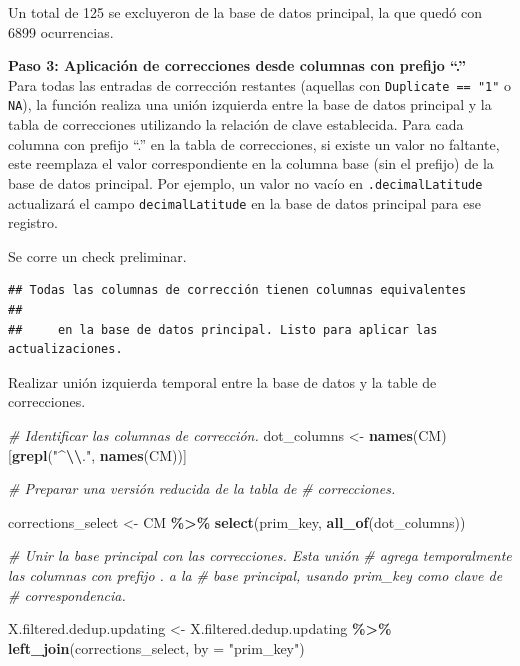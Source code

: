 \documentclass[sn-apa,pdflatex]{sn-jnl}
\newenvironment{Shaded}{\begin{snugshade}}{\end{snugshade}}
\newcommand{\AttributeTok}[1]{\textcolor[rgb]{0.13,0.29,0.53}{#1}}
\newcommand{\CommentTok}[1]{\textcolor[rgb]{0.56,0.35,0.01}{\textit{#1}}}
\newcommand{\FunctionTok}[1]{\textcolor[rgb]{0.13,0.29,0.53}{\textbf{#1}}}
\newcommand{\NormalTok}[1]{#1}
\newcommand{\OtherTok}[1]{\textcolor[rgb]{0.56,0.35,0.01}{#1}}
\newcommand{\SpecialCharTok}[1]{\textcolor[rgb]{0.81,0.36,0.00}{\textbf{#1}}}
\newcommand{\StringTok}[1]{\textcolor[rgb]{0.31,0.60,0.02}{#1}}
\begin{document}
Un total de 125 se excluyeron de la base de datos principal, la que
quedó con 6899 ocurrencias.

\textbf{Paso 3: Aplicación de correcciones desde columnas con prefijo
``.''}\\
Para todas las entradas de corrección restantes (aquellas con
\texttt{Duplicate\ ==\ "1"} o \texttt{NA}), la función realiza una unión
izquierda entre la base de datos principal y la tabla de correcciones
utilizando la relación de clave establecida. Para cada columna con
prefijo ``.'' en la tabla de correcciones, si existe un valor no
faltante, este reemplaza el valor correspondiente en la columna base
(sin el prefijo) de la base de datos principal. Por ejemplo, un valor no
vacío en \texttt{.decimalLatitude} actualizará el campo
\texttt{decimalLatitude} en la base de datos principal para ese
registro.

Se corre un check preliminar.

\begin{verbatim}
## Todas las columnas de corrección tienen columnas equivalentes 
##  
##     en la base de datos principal. Listo para aplicar las actualizaciones.
\end{verbatim}

Realizar unión izquierda temporal entre la base de datos y la table de
correcciones.

\begin{Shaded}
\begin{Highlighting}[]
\CommentTok{\# Identificar las columnas de corrección.}
\NormalTok{dot\_columns }\OtherTok{\textless{}{-}} \FunctionTok{names}\NormalTok{(CM)[}\FunctionTok{grepl}\NormalTok{(}\StringTok{"\^{}}\SpecialCharTok{\textbackslash{}\textbackslash{}}\StringTok{."}\NormalTok{, }\FunctionTok{names}\NormalTok{(CM))]}

\CommentTok{\# Preparar una versión reducida de la tabla de}
\CommentTok{\# correcciones.}

\NormalTok{corrections\_select }\OtherTok{\textless{}{-}}\NormalTok{ CM }\SpecialCharTok{\%\textgreater{}\%}
    \FunctionTok{select}\NormalTok{(prim\_key, }\FunctionTok{all\_of}\NormalTok{(dot\_columns))}


\CommentTok{\# Unir la base principal con las correcciones.  Esta unión}
\CommentTok{\# agrega temporalmente las columnas con prefijo \textquotesingle{}.\textquotesingle{} a la}
\CommentTok{\# base principal, usando \textasciigrave{}prim\_key\textasciigrave{} como clave de}
\CommentTok{\# correspondencia.}

\NormalTok{X.filtered.dedup.updating }\OtherTok{\textless{}{-}}\NormalTok{ X.filtered.dedup.updating }\SpecialCharTok{\%\textgreater{}\%}
    \FunctionTok{left\_join}\NormalTok{(corrections\_select, }\AttributeTok{by =} \StringTok{"prim\_key"}\NormalTok{)}
\end{Highlighting}
\end{Shaded}
\end{document}
